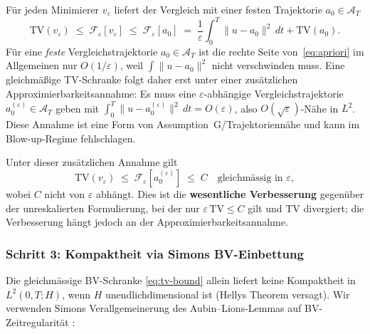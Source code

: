 \documentclass[12pt,a4paper]{article}
\theoremstyle{definition}
\theoremstyle{plain}
\theoremstyle{remark}
\begin{document}
F\"ur jeden Minimierer $v_\varepsilon$ liefert der Vergleich mit einer festen Trajektorie $a_0 \in \mathcal{A}_T$
\begin{equation}\label{eq:apriori}
  \mathrm{TV}(v_\varepsilon) \;\leq\; \mathcal{F}_\varepsilon[v_\varepsilon] \;\leq\; \mathcal{F}_\varepsilon[a_0] \;=\; \frac{1}{\varepsilon}\int_0^T \|u - a_0\|^2\,dt + \mathrm{TV}(a_0).
\end{equation}
Für eine \emph{feste} Vergleichstrajektorie $a_0 \in \mathcal{A}_T$ ist die rechte Seite von~\eqref{eq:apriori} im Allgemeinen nur $O(1/\varepsilon)$, weil $\int\|u-a_0\|^2$ nicht verschwinden muss. Eine gleichmäßige TV-Schranke folgt daher erst unter einer zusätzlichen Approximierbarkeitsannahme: Es muss eine $\varepsilon$-abhängige Vergleichstrajektorie $a_0^{(\varepsilon)} \in \mathcal{A}_T$ geben mit $\int_0^T\|u-a_0^{(\varepsilon)}\|^2\,dt=O(\varepsilon)$, also $O(\sqrt{\varepsilon})$-Nähe in $L^2$. Diese Annahme ist eine Form von Assumption~G/Trajektoriennähe und kann im Blow-up-Regime fehlschlagen.

Unter dieser zusätzlichen Annahme gilt
\begin{equation}\label{eq:tv-bound}
  \mathrm{TV}(v_\varepsilon) \;\leq\; \mathcal{F}_\varepsilon[a_0^{(\varepsilon)}] \;\leq\; C \quad \text{gleichm\"assig in } \varepsilon,
\end{equation}
wobei $C$ nicht von $\varepsilon$ abhängt. Dies ist die \textbf{wesentliche Verbesserung} gegen\"uber der unreskalierten Formulierung, bei der nur $\varepsilon\,\mathrm{TV} \leq C$ gilt und TV divergiert; die Verbesserung hängt jedoch an der Approximierbarkeitsannahme.

\subsubsection*{Schritt 3: Kompaktheit via Simons BV-Einbettung}

Die gleichm\"assige BV-Schranke \eqref{eq:tv-bound} allein liefert keine Kompaktheit in $L^2(0,T;H)$, wenn $H$ unendlichdimensional ist (Hellys Theorem versagt). Wir verwenden Simons Verallgemeinerung des Aubin--Lions-Lemmas auf BV-Zeitregularit\"at \cite{Simon1987}:
\end{document}
